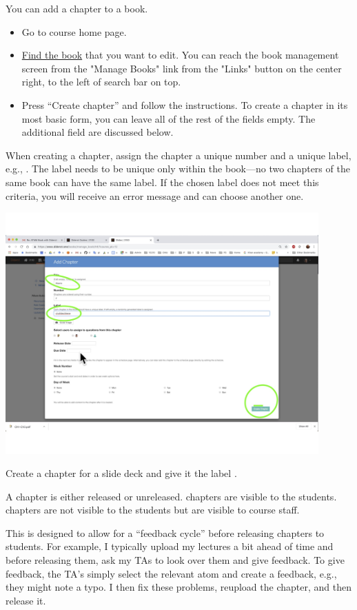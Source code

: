 \begin{gram}
\label{guide:chapter::create}
You can add a chapter to a book.  
\begin{itemize}
\item Go to course home page.
\item \href{guide::author::go-book-management}{Find the book} that you
  want to edit.  You can reach the book management screen from the
  "Manage Books" link from the "Links" button on the center right, to
  the left of search bar on top.

\item  Press ``Create chapter'' and follow the instructions.  To create a chapter in its most basic form, you can leave all of the rest of the fields empty.  The additional field are discussed below.
\end{itemize}
%

When creating a chapter, assign the chapter a unique number and a unique label, e.g., .  
%
The label needs to be unique only within the book---no two chapters of
the same book can have the same label.
%
If the chosen label does not meet this criteria, you will receive an error message and can choose another one.

\includegraphics[width=0.9\textwidth]{lms/media/create-chapter.jpg}
\end{gram}

\begin{exercise}
Create a chapter for a slide deck and give it the label
.
\end{exercise}


\begin{gram}
A chapter is either released or unreleased. 
%
 chapters are visible to the students.
%
 chapters are not visible to the students but  are visible to course staff.  

This is designed to allow for a ``feedback cycle'' before releasing chapters to students.  
%
For example, I typically  upload my lectures a bit ahead of time and before releasing them, ask my TAs to look over them and give feedback.
%
To give feedback, the TA's simply select the relevant atom and create a feedback, e.g., they might note a typo.
%
I then fix these problems, reupload the chapter, and then release it.  
\end{gram}

